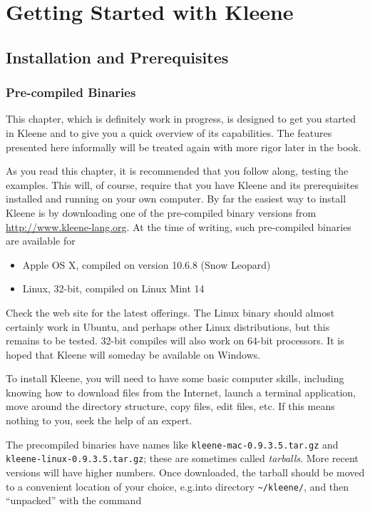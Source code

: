 \chapter{Getting Started with Kleene}

\section{Installation and Prerequisites}

\subsection{Pre-compiled Binaries}

This chapter, which is definitely work in progress, is designed to get
you started in Kleene and to give you a quick overview of its capabilities.
The features presented here informally will be treated again with 
more rigor later in the book.

As you read this chapter, it is recommended that you follow along, testing
the examples.  This will, of course, require that you have Kleene and its
prerequisites installed and running on your own computer.  By far the
easiest way to install Kleene is by downloading one of the pre-compiled
binary versions from \url{http://www.kleene-lang.org}.  At the time of
writing, such pre-compiled binaries are available for

\begin{itemize}
\item
Apple OS X, compiled on version 10.6.8 (Snow Leopard)
\item
Linux, 32-bit, compiled on Linux Mint 14
\end{itemize}

\noindent
Check the web site for the latest offerings.  
The Linux binary should almost certainly work in Ubuntu, and perhaps other Linux
distributions, but this remains to be tested.  32-bit compiles will also work on 64-bit
processors.  It is hoped that Kleene will someday be available on Windows.

To install Kleene, you will need to have some basic computer skills, including knowing how
to
download files from the Internet,
launch a terminal application, move around the directory structure,
copy files, edit files, etc.  If this means nothing to you, seek the
help of an expert.

The precompiled binaries have names like \texttt{kleene-mac-0.9.3.5.tar.gz} and
\texttt{kleene-linux-0.9.3.5.tar.gz}; these are sometimes called \emph{tarballs}.  More recent
versions will have higher numbers.  Once downloaded, the tarball should be moved
to a convenient location of your choice, e.g.\@ into directory 
\texttt{\~{}/kleene/}, and then
``unpacked'' with the command


